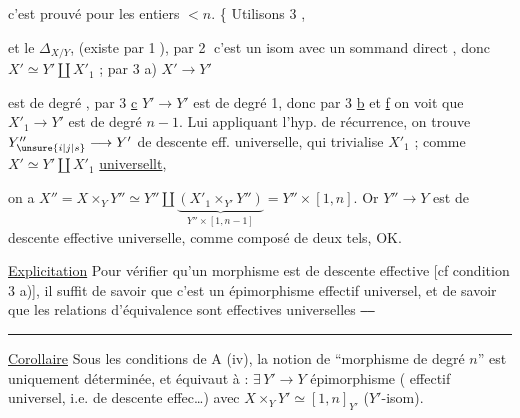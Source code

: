 
c'est prouvé pour les entiers $<n$. \{ Utilisons 3 ,


et  le   $\Delta_{X/Y}$,  (existe par \textcircled{1}), par \textcircled{2} c'est un isom avec un sommand direct , donc $X'\simeq Y'\amalg X'_1$ ; par 3 a) $X'\longrightarrow Y'$

est de degré ,  par 3 \uline{c} $Y'\longrightarrow Y'$ est de degré 1, donc par 3 \uline{b} et \uline{f} on voit que $X'_1\longrightarrow Y'$ est de degré $n-1$. Lui appliquant l'hyp. de récurrence, on trouve $Y''_{\unsure{i|j|s}}\longrightarrow Y'$  de descente eff. universelle, qui trivialise $X'_1$ ; comme $X'\simeq Y'\amalg X'_1$ \uline{universellt},

on a $X''=X\times_Y Y''\simeq Y''\amalg\underbrace{(X'_1\times_{Y'}Y'')}_{Y''\times[1,n-1]}=Y''\times[1,n]$. Or $Y''\longrightarrow Y$ est de descente effective universelle, comme composé de deux tels, OK.

\uline{Explicitation} Pour vérifier qu'un  morphisme est de descente effective [cf condition 3 a)], il suffit de savoir que c'est un épimorphisme effectif universel, et de savoir que les relations d'équivalence sont effectives universelles \texttt{------}


\noindent\rule{.25\linewidth}{.3pt}

\uline{Corollaire} Sous les conditions de A (iv), la notion de ``morphisme de degré $n$'' est uniquement déterminée, et  équivaut à : $\exists\,Y'\longrightarrow Y$ épimorphisme (  effectif universel, i.e. de descente effec\ldots{}) avec $X\times_Y Y'\simeq[1,n]_{Y'}$ ($Y'$-isom).

